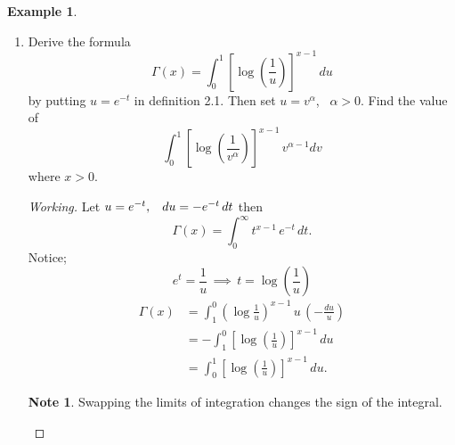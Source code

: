 \documentclass[12pt,a4paper]{report}
\theoremstyle{definition}
\newtheorem{exa}[thm]{Example}
\newtheorem{note}[thm]{Note}
\theoremstyle{plain}
\begin{document}
\begin{exa}
\begin{enumerate}
\begin{proof}[Working]
\begin{enumerate}
\item[(ii).] Let $4x = u^2\, \implies\, 2dx = udu$, so
\begin{align*}
\int^{\infty}_0 x^{\frac{3}{2}}\, e^{-4x}\, dx & = \int^{\infty}_0\left(\frac{u^2}{4}\right)^{\frac{3}{2}}\, e^{-u^2}\, \frac{u\, du}{2}\\
& = \int_0^{\infty} \frac{u^4}{16}\, e^{-u^2}\, du\\
& = \frac{1}{16}\int_0^{\infty} u^4\, e^{-u^2}\, du\\
& = \frac{1}{16}\int_0^{\infty}u^{2y-1}\, e^{-u^2}\, du\hspace{0.5cm} \text{letting}\,\, 4 = 2y  - 1 \, \implies\, y = \frac{5}{2}\\
& = \frac{1}{16}\, \cdot\, \frac{1}{2}\Gamma\left(\frac{5}{2}\right)
\end{align*}
\end{enumerate}
\end{proof}



\item[(c).] Derive the formula $$\Gamma(x) = \int^1_0\left[\log\left(\frac{1}{u}\right)\right]^{x-1}\, du$$
by putting $u = e^{-t}$ in definition 2.1. Then set $u = v^{\alpha}$, \, $\alpha >0$. Find the value of $$\int_0^1\left[\log\left(\frac{1}{v^{\alpha}}\right)\right]^{x-1}\, v^{\alpha - 1} dv$$ where $x > 0$.

\begin{proof}[Working]
Let $u = e^{-t}, \hspace{0.3cm} du = -e^{-t}\, dt$
then $$\Gamma(x) = \int_0^{\infty} t^{x-1}\, e^{-t}\, dt.$$ Notice; $$e^t = \frac{1}{u}\, \implies\, t = \log\left(\frac{1}{u}\right)$$
\begin{align*}
\Gamma(x)  & = \int_1^0 \left(\log \frac{1}{u}\right)^{x-1}\, u\, \left(-\frac{du}{u}\right)\\
           & = -\int^0_1\left[\log\left(\frac{1}{u}\right)\right]^{x-1}\, du\\
           & = \int^1_0\left[\log\left(\frac{1}{u}\right)\right]^{x-1}\, du.
\end{align*}
\begin{note}
Swapping the limits of integration changes the sign of the integral.
\end{note}


\end{proof}
\end{enumerate}
\end{exa}
\end{document}
